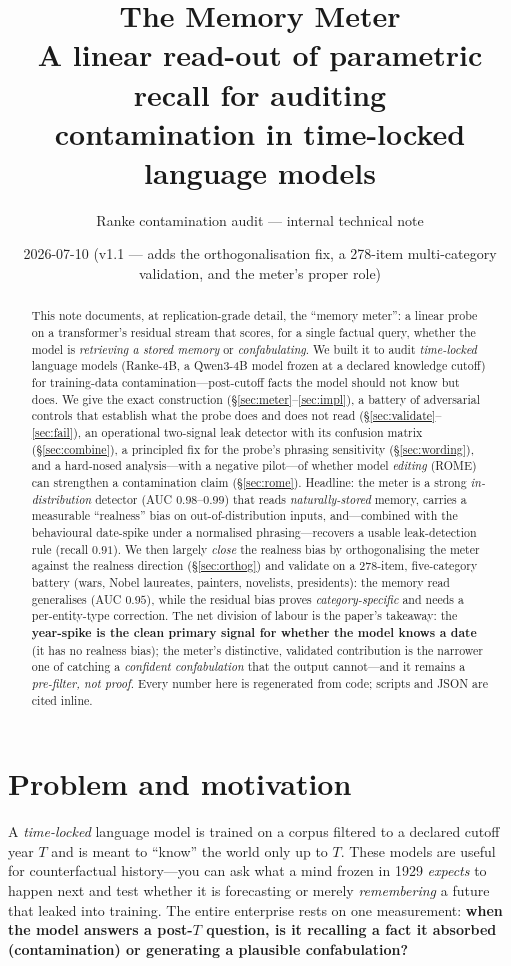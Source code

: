\documentclass[11pt]{article}
\title{\textbf{The Memory Meter}\\[2pt]\large A linear read-out of parametric recall for auditing\\ contamination in time-locked language models}
\author{Ranke contamination audit --- internal technical note}
\date{2026-07-10 \quad(v1.1 --- adds the orthogonalisation fix, a 278-item multi-category validation, and the meter's proper role)}
\begin{document}
\maketitle

\begin{abstract}
\noindent This note documents, at replication-grade detail, the ``memory meter'': a linear probe on a transformer's
residual stream that scores, for a single factual query, whether the model is \emph{retrieving a stored memory} or
\emph{confabulating}. We built it to audit \emph{time-locked} language models (Ranke-4B, a Qwen3-4B model frozen at a
declared knowledge cutoff) for training-data contamination---post-cutoff facts the model should not know but does. We
give the exact construction (\S\ref{sec:meter}--\ref{sec:impl}), a battery of adversarial controls that establish what
the probe does and does not read (\S\ref{sec:validate}--\ref{sec:fail}), an operational two-signal leak detector with
its confusion matrix (\S\ref{sec:combine}), a principled fix for the probe's phrasing sensitivity (\S\ref{sec:wording}),
and a hard-nosed analysis---with a negative pilot---of whether model \emph{editing} (ROME) can strengthen a
contamination claim (\S\ref{sec:rome}). Headline: the meter is a strong \emph{in-distribution} detector
(AUC $0.98$--$0.99$) that reads \emph{naturally-stored} memory, carries a measurable ``realness'' bias on
out-of-distribution inputs, and---combined with the behavioural date-spike under a normalised phrasing---recovers a
usable leak-detection rule (recall $0.91$). We then largely \emph{close} the realness bias by orthogonalising the
meter against the realness direction (\S\ref{sec:orthog}) and validate on a 278-item, five-category battery
(wars, Nobel laureates, painters, novelists, presidents): the memory read generalises (AUC $0.95$), while the residual
bias proves \emph{category-specific} and needs a per-entity-type correction. The net division of labour is the paper's
takeaway: the \textbf{year-spike is the clean primary signal for whether the model knows a date} (it has no realness
bias); the meter's distinctive, validated contribution is the narrower one of catching a \emph{confident confabulation}
that the output cannot---and it remains a \emph{pre-filter, not proof}. Every number here is regenerated from code;
scripts and JSON are cited inline.
\end{abstract}

\tableofcontents

\section{Problem and motivation}
A \emph{time-locked} language model is trained on a corpus filtered to a declared cutoff year $T$ and is meant to
``know'' the world only up to $T$. These models are useful for counterfactual history---you can ask what a mind frozen in
1929 \emph{expects} to happen next and test whether it is forecasting or merely \emph{remembering} a future that leaked
into training. The entire enterprise rests on one measurement: \textbf{when the model answers a post-$T$ question, is it
recalling a fact it absorbed (contamination) or generating a plausible confabulation?}
\end{document}
